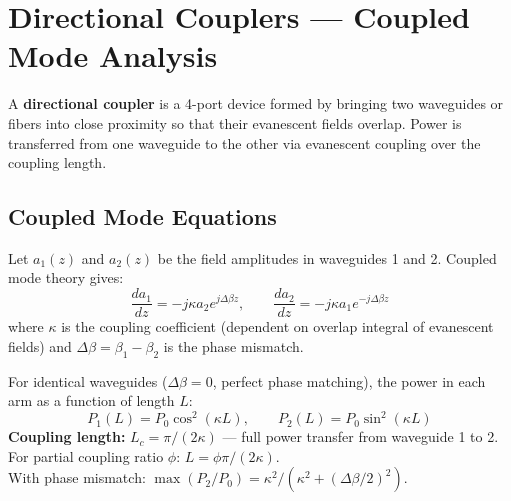 \documentclass[12pt,a4paper]{article}
\begin{document}
\section{Directional Couplers --- Coupled Mode Analysis}

\begin{tcolorbox}[defbox, title={\textbf{Directional Coupler}}]
A \textbf{directional coupler} is a 4-port device formed by bringing two waveguides or fibers into close proximity so that their evanescent fields overlap. Power is transferred from one waveguide to the other via evanescent coupling over the coupling length.
\end{tcolorbox}

\subsection{Coupled Mode Equations}
Let $a_1(z)$ and $a_2(z)$ be the field amplitudes in waveguides 1 and 2. Coupled mode theory gives:
\[
\frac{da_1}{dz} = -j\kappa a_2 e^{j\Delta\beta z}, \qquad \frac{da_2}{dz} = -j\kappa a_1 e^{-j\Delta\beta z}
\]
where $\kappa$ is the coupling coefficient (dependent on overlap integral of evanescent fields) and $\Delta\beta = \beta_1 - \beta_2$ is the phase mismatch.

\begin{tcolorbox}[formulabox, title={\textbf{Power Transfer in a Directional Coupler}}]
For identical waveguides ($\Delta\beta = 0$, perfect phase matching), the power in each arm as a function of length $L$:
\[
P_1(L) = P_0 \cos^2(\kappa L), \qquad P_2(L) = P_0 \sin^2(\kappa L)
\]
\textbf{Coupling length:} $L_c = \pi/(2\kappa)$ --- full power transfer from waveguide 1 to 2.\\
For partial coupling ratio $\phi$: $L = \phi\pi/(2\kappa)$.\\
With phase mismatch: $\max(P_2/P_0) = \kappa^2/(\kappa^2 + (\Delta\beta/2)^2)$.
\end{tcolorbox}
\end{document}
